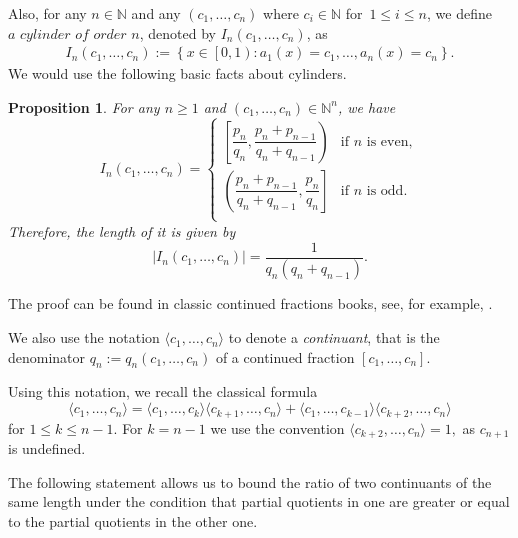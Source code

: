 \documentclass{amsart}
\newtheorem{lemma}[theorem]{Lemma}
\newtheorem{proposition}[theorem]{Proposition}
\theoremstyle{definition}
\newcommand{\N}{\mathbb N}%
\newcommand{\0}{\mbf 0}%
\def\N{\mathbb N}
\begin{document}
Also, for any $n\in\N$ and any $\left(c_{1},\ldots,c_{n}\right)$ where $c_{i}\in\mathbb{N}$ for $\, 1\leq i \leq n$, we define $\textit{a cylinder of order }n$, denoted by $I_{n}\left(c_{1},\ldots,c_{n}\right)$, as
\begin{align*}
I_{n}\left(c_{1},\ldots,c_{n}\right):=\left\{x\in\left[0,1\right):a_{1}\left(x\right)=c_{1},\ldots,a_{n}\left(x\right)=c_{n}\right\}.
\end{align*}
We would use the following basic facts about cylinders.
\begin{proposition}\label{range}
For any $n\ge 1$ and $\left(c_{1},\ldots,c_{n}\right)\in\mathbb{N}^{n}$, we have
\begin{equation}I_{n}\left(c_{1},\ldots,c_{n}\right)=\left\{
  \begin{array}{ll}
   \left[\dfrac{p_{n}}{q_{n}},\dfrac{p_{n}+p_{n-1}}{q_{n}+q_{n-1}}\right) &\textrm{if }n\textrm{ is even},\\
   \left(\dfrac{p_{n}+p_{n-1}}{q_{n}+q_{n-1}},\dfrac{p_{n}}{q_{n}}\right] &\textrm{if }n\textrm{ is odd}.\\
  \end{array}
\right.
\end{equation}
Therefore, the length of it is given by
\begin{equation}\label{length}
\left|I_{n}\left(c_{1},\ldots,c_{n}\right)\right|=\dfrac{1}{q_{n}\left(q_{n}+q_{n-1}\right)}.
\end{equation}
\end{proposition}
The proof can be found in classic continued fractions books, see, for example, \cite{Khinchin_book}.


We also use the notation $\langle c_1,\ldots,c_n \rangle$ to denote a {\it continuant}, that is the denominator $q_n:=q_n(c_1,\ldots,c_n)$ of a continued fraction $[c_1,\ldots,c_n]$.

Using this notation, we recall the classical formula
$$
\langle c_1,\ldots,c_n \rangle = \langle c_1,\ldots,c_k \rangle \langle c_{k+1},\ldots,c_n \rangle  + \langle c_1,\ldots,c_{k-1} \rangle \langle c_{k+2},\ldots,c_n \rangle
$$
for $1\leq k \leq n-1$. For $k=n-1$ we use the convention $\langle c_{k+2},\ldots,c_n \rangle=1,$ as $c_{n+1}$ is undefined.

The following statement allows us to bound the ratio of two continuants of the same length under the condition that partial quotients in one are greater or equal to the partial quotients in the other one.
\end{document}
